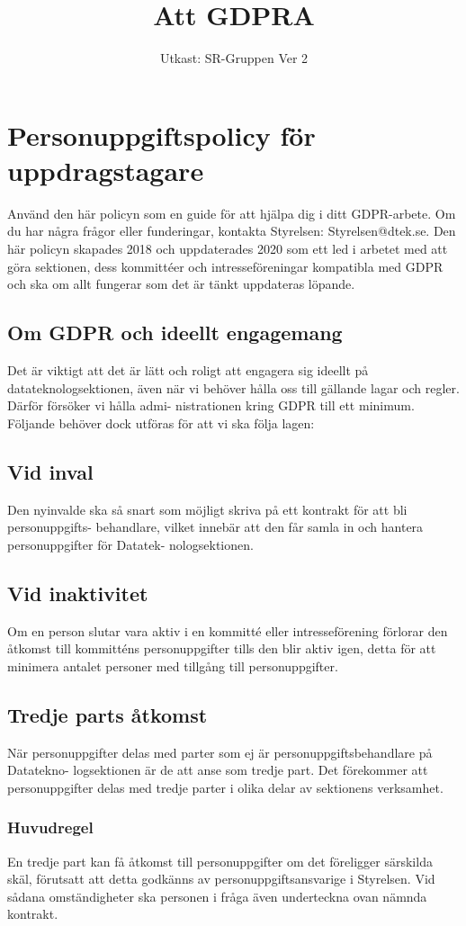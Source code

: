 \documentclass[a4paper]{dtek}
\title{Att GDPRA}
\date{Utkast: SR-Gruppen Ver 2}
\begin{document}
\section{Personuppgiftspolicy för uppdragstagare}
Använd den här policyn som en guide för att hjälpa dig i ditt GDPR-arbete. Om du har
några frågor eller funderingar, kontakta Styrelsen: Styrelsen@dtek.se.
Den här policyn skapades 2018 och uppdaterades 2020 som ett led i arbetet med att göra
sektionen, dess kommittéer och intresseföreningar kompatibla med GDPR och ska om allt
fungerar som det är tänkt uppdateras löpande.

\subsection{Om GDPR och ideellt engagemang}
Det är viktigt att det är lätt och roligt att engagera sig ideellt på datateknologsektionen,
även när vi behöver hålla oss till gällande lagar och regler. Därför försöker vi hålla admi-
nistrationen kring GDPR till ett minimum. Följande behöver dock utföras för att vi ska
följa lagen:

\subsection{Vid inval}
Den nyinvalde ska så snart som möjligt skriva på ett kontrakt för att bli personuppgifts-
behandlare, vilket innebär att den får samla in och hantera personuppgifter för Datatek-
nologsektionen.

\subsection{Vid inaktivitet}
Om en person slutar vara aktiv i en kommitté eller intresseförening förlorar den åtkomst
till kommitténs personuppgifter tills den blir aktiv igen, detta för att minimera antalet
personer med tillgång till personuppgifter.

\subsection{Tredje parts åtkomst}
När personuppgifter delas med parter som ej är personuppgiftsbehandlare på Datatekno-
logsektionen är de att anse som tredje part. Det förekommer att personuppgifter delas med
tredje parter i olika delar av sektionens verksamhet.

\subsubsection{Huvudregel}
En tredje part kan få åtkomst till personuppgifter om det föreligger särskilda skäl, förutsatt
att detta godkänns av personuppgiftsansvarige i Styrelsen. Vid sådana omständigheter ska
personen i fråga även underteckna ovan nämnda kontrakt.
\end{document}
